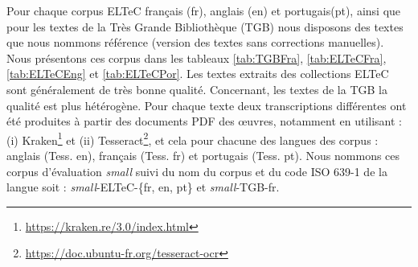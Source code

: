 Pour chaque corpus ELTeC français (fr), anglais (en) et portugais(pt), ainsi que pour les textes de la Très Grande Bibliothèque (TGB) nous disposons des textes que nous nommons \og{}référence\fg{} (version des textes sans corrections manuelles). Nous présentons ces corpus dans les tableaux \ref{tab:TGBFra}, \ref{tab:ELTeCFra}, \ref{tab:ELTeCEng} et \ref{tab:ELTeCPor}. Les textes extraits des collections ELTeC sont généralement de très bonne qualité. Concernant, les textes de la TGB la qualité est plus hétérogène. Pour chaque texte deux transcriptions différentes ont été produites à partir des documents PDF des œuvres, notamment en utilisant : (i) Kraken\footnote{\url{https://kraken.re/3.0/index.html}} \cite{kiessling2019escriptorium} et (ii) Tesseract\footnote{\url{https://doc.ubuntu-fr.org/tesseract-ocr}}, et cela pour chacune des langues des corpus : anglais (Tess. en), français (Tess. fr) et portugais (Tess. pt). Nous nommons ces corpus d'évaluation \textit{small} suivi du nom du corpus et du code ISO 639-1 de la langue soit : \textit{small}-ELTeC-\{fr, en, pt\} et \textit{small}-TGB-fr. 

